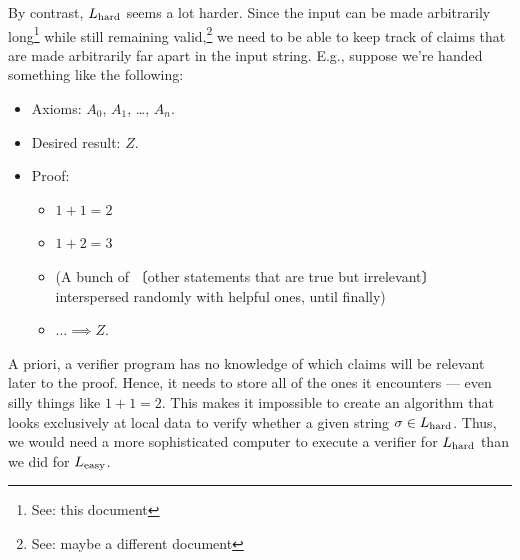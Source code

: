 \documentclass{fkpaper}
\newcommand{\np}[1]{\hspace{-.55em}〔#1〕\hspace{-.55em}}
\begin{document}
\begin{multicols}{2}
By contrast, $L_{\rm hard}$ seems a lot harder. Since the input can be
made arbitrarily long\footnote{See: this document} while still
remaining valid,\footnote{See: maybe a different document} we need to
be able to keep track of claims that are made arbitrarily far apart in
the input string. E.g., suppose we're handed something like the
following:
\begin{itemize}
  \item Axioms: $A_0$, $A_1$, \ldots, $A_n$.
  \item Desired result: $Z$.
  \item Proof:
    \begin{itemize}
      \item $1 + 1 = 2$
      \item $1 + 2 = 3$
      \item (A bunch of \np{other statements that are true but
        irrelevant} interspersed randomly with helpful ones, until
        finally)
      \item $\ldots \implies Z$.
    \end{itemize}
\end{itemize}
A priori, a verifier program has no knowledge of which claims will be
relevant later to the proof. Hence, it needs to store all of the ones
it encounters --- even silly things like $1+1 = 2$. This makes it
impossible to create an algorithm that looks exclusively at local data
to verify whether a given string $\sigma \in L_{\rm hard}$. Thus, we
would need a more sophisticated computer to execute a verifier for
$L_{\rm hard}$ than we did for $L_{\rm easy}$.



\end{multicols}
\end{document}
